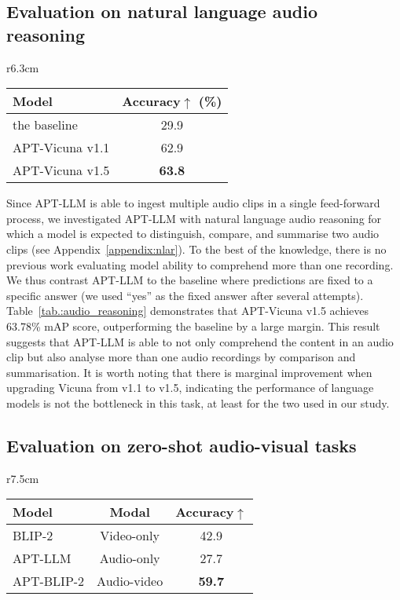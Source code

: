 \subsection{Evaluation on natural language audio reasoning} \label{subsec:evaluation_on_nlar}
\begin{wraptable}{r}{6.3cm}
    \caption{Benchmarking APT on the natural language audio reasoning task.}
    \label{tab.:audio_reasoning}
    \begin{tabular}{lc}
    \toprule
    Model               & Accuracy$\uparrow$ (\%)         \\ \hline
    the baseline        & 29.9              \\
    APT-Vicuna v1.1 & 62.9              \\
    APT-Vicuna v1.5 & \textbf{63.8}     \\ \bottomrule
    \end{tabular}
\end{wraptable}

Since APT-LLM is able to ingest multiple audio clips in a single feed-forward process, we investigated APT-LLM with natural language audio reasoning for which a model is expected to distinguish, compare, and summarise two audio clips (see Appendix~\ref{appendix:nlar}). To the best of the knowledge, there is no previous work evaluating model ability to comprehend more than one recording. We thus contrast APT-LLM to the baseline where predictions are fixed to a specific answer (we used ``yes'' as the fixed answer after several attempts). Table~\ref{tab.:audio_reasoning} demonstrates that APT-Vicuna v1.5 achieves 63.78\% mAP score, outperforming the baseline by a large margin. This result suggests that APT-LLM is able to not only comprehend the content in an audio clip but also analyse more than one audio recordings by comparison and summarisation. It is worth noting that there is marginal improvement when upgrading Vicuna from v1.1 to v1.5, indicating the performance of language models is not the bottleneck in this task, at least for the two used in our study.

\subsection{Evaluation on zero-shot audio-visual tasks} \label{subsec:evaluation_on_audio-visual_tasks}

\begin{wraptable}{r}{7.5cm}
    \caption{Performance comparison between different modalities in audio-visual learning.}
    \label{tab.:av_learning}
    \begin{tabular}{@{}lcc@{}}
    \toprule
    Model                         & Modal       & Accuracy$\uparrow$         \\ \midrule
    BLIP-2~\citep{li_blip-2_2023} & Video-only  & 42.9             \\
    APT-LLM             & Audio-only  & 27.7                  \\
    APT-BLIP-2                  & Audio-video & \textbf{59.7}    \\ \bottomrule
    \end{tabular}
\end{wraptable}

